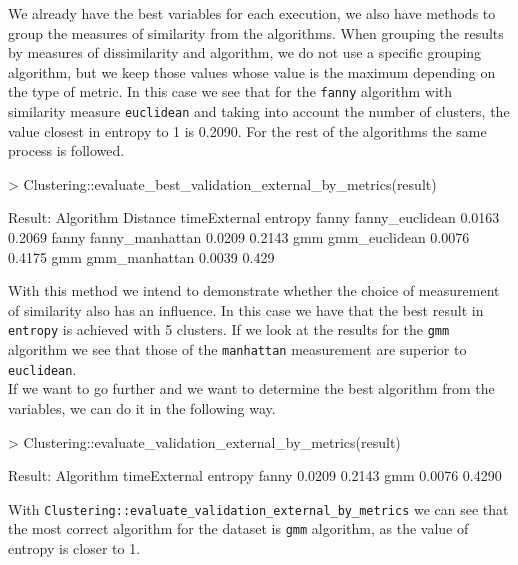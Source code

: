 We already have the best variables for each execution, we also have methods to group the measures of similarity from the algorithms. When grouping the results by measures of dissimilarity and algorithm, we do not use a specific grouping algorithm, but we keep those values whose value is the maximum depending on the type of metric. In this case we see that for the \texttt{fanny} algorithm with similarity measure \texttt{euclidean} and taking into account the number of clusters, the value closest in entropy to 1 is 0.2090. For the rest of the algorithms the same process is followed.

\begin{Schunk}
\begin{Sinput}
> Clustering::evaluate_best_validation_external_by_metrics(result)
\end{Sinput}
\begin{Soutput}
Result:
Algorithm     Distance      timeExternal entropy
 fanny     fanny_euclidean      0.0163   0.2069
 fanny     fanny_manhattan      0.0209   0.2143
  gmm       gmm_euclidean       0.0076   0.4175
  gmm       gmm_manhattan       0.0039   0.429
\end{Soutput}
\end{Schunk}

With this method we intend to demonstrate whether the choice of measurement of similarity also has an influence.
In this case we have that the best result in \texttt{entropy} is achieved with 5 clusters. If we look at the results for the \texttt{gmm} algorithm we see that those of the \texttt{manhattan} measurement are superior to \texttt{euclidean}.
\\
If we want to go further and we want to determine the best algorithm from the variables, we can do it in the following way.

\begin{Schunk}
\begin{Sinput}
> Clustering::evaluate_validation_external_by_metrics(result)
\end{Sinput}
\begin{Soutput}
Result:
  Algorithm timeExternal entropy
    fanny     0.0209     0.2143
    gmm       0.0076     0.4290
\end{Soutput}
\end{Schunk}

With \texttt{Clustering::evaluate\_validation\_external\_by\_metrics} we can see that the most correct algorithm for the dataset is \texttt{gmm} algorithm, as the value of entropy is closer to 1.

